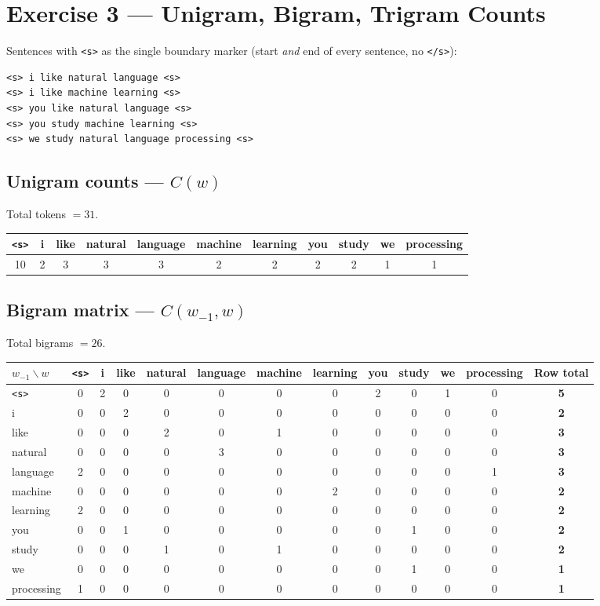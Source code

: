 \documentclass[11pt]{article}
\newcommand{\sTok}{\texttt{<s>}}
\begin{document}
\section*{Exercise 3 --- Unigram, Bigram, Trigram Counts}

Sentences with \sTok{} as the single boundary marker (start \emph{and} end of every sentence, no \texttt{</s>}):
\begin{verbatim}
<s> i like natural language <s>
<s> i like machine learning <s>
<s> you like natural language <s>
<s> you study machine learning <s>
<s> we study natural language processing <s>
\end{verbatim}

\subsection*{Unigram counts --- $C(w)$}
Total tokens $= 31$.
\begin{table}[h]
\centering
\begin{tabular}{ccccccccccc}
\toprule
\sTok & i & like & natural & language & machine & learning & you & study & we & processing \\
\midrule
10 & 2 & 3 & 3 & 3 & 2 & 2 & 2 & 2 & 1 & 1 \\
\bottomrule
\end{tabular}
\end{table}

\subsection*{Bigram matrix --- $C(w_{-1}, w)$}
Total bigrams $= 26$.
\begin{table}[h]
\centering
\footnotesize
\setlength{\tabcolsep}{4pt}
\begin{tabular}{lcccccccccccc}
\toprule
$w_{-1} \backslash w$ & \sTok & i & like & natural & language & machine & learning & you & study & we & processing & Row total \\
\midrule
\sTok & 0 & 2 & 0 & 0 & 0 & 0 & 0 & 2 & 0 & 1 & 0 & \textbf{5} \\
i & 0 & 0 & 2 & 0 & 0 & 0 & 0 & 0 & 0 & 0 & 0 & \textbf{2} \\
like & 0 & 0 & 0 & 2 & 0 & 1 & 0 & 0 & 0 & 0 & 0 & \textbf{3} \\
natural & 0 & 0 & 0 & 0 & 3 & 0 & 0 & 0 & 0 & 0 & 0 & \textbf{3} \\
language & 2 & 0 & 0 & 0 & 0 & 0 & 0 & 0 & 0 & 0 & 1 & \textbf{3} \\
machine & 0 & 0 & 0 & 0 & 0 & 0 & 2 & 0 & 0 & 0 & 0 & \textbf{2} \\
learning & 2 & 0 & 0 & 0 & 0 & 0 & 0 & 0 & 0 & 0 & 0 & \textbf{2} \\
you & 0 & 0 & 1 & 0 & 0 & 0 & 0 & 0 & 1 & 0 & 0 & \textbf{2} \\
study & 0 & 0 & 0 & 1 & 0 & 1 & 0 & 0 & 0 & 0 & 0 & \textbf{2} \\
we & 0 & 0 & 0 & 0 & 0 & 0 & 0 & 0 & 1 & 0 & 0 & \textbf{1} \\
processing & 1 & 0 & 0 & 0 & 0 & 0 & 0 & 0 & 0 & 0 & 0 & \textbf{1} \\
\bottomrule
\end{tabular}
\end{table}
\end{document}
